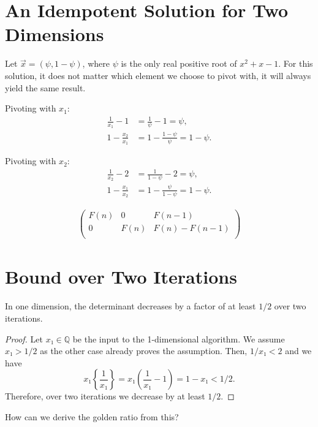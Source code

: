 \section{An Idempotent Solution for Two Dimensions}

Let $\vec x = (\psi, 1 - \psi)$, where $\psi$ is the only real positive root of $x^2 + x - 1$.
For this solution, it does not matter which element we choose to pivot with, it will always
yield the same result.

Pivoting with $x_1$:
\begin{align*}
  \frac{1}{x_1} - 1 & = \frac{1}{\psi} - 1 = \psi, \\
  1 - \frac{x_2}{x_1} & = 1 - \frac{1 - \psi}{\psi} = 1 - \psi.
\end{align*}

Pivoting with $x_2$:
\begin{align*}
  \frac{1}{x_2} - 2 & = \frac{1}{1 - \psi} - 2 = \psi, \\
  1 - \frac{x_1}{x_2} & = 1 - \frac{\psi}{1 - \psi} = 1 - \psi.
\end{align*}

\begin{align*}
  \left(
  \begin{array}{cc|c}
    F(n) & 0    & F(n-1) \\
    0    & F(n) & F(n) - F(n-1) \\
  \end{array}
  \right)
\end{align*}

\section{Bound over Two Iterations}

\begin{proposition}
  In one dimension, the determinant decreases by a factor of at least $1/2$ over
  two iterations.
\end{proposition}

\begin{proof}
  Let $x₁ ∈ ℚ$ be the input to the 1-dimensional algorithm.
  We assume $x₁ > 1/2$ as the other case already proves the assumption.
  Then, $1/x₁ < 2$ and we have
  $$
    x₁ \left\{\frac{1}{x₁}\right\}
    = x₁ \left(\frac{1}{x₁} - 1\right)
    = 1 - x₁ < 1/2.
    $$
  Therefore, over two iterations we decrease by at least $1/2$.
\end{proof}

How can we derive the golden ratio from this?

